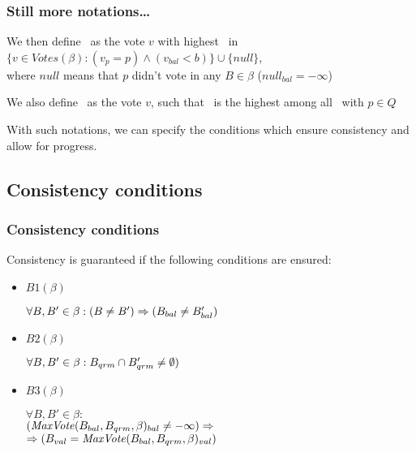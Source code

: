 \documentclass[10 pt]{beamer}
\begin{document}
\begin{frame}
  \frametitle{Still more notations\ldots}

  We then define \maxvotep\ as the vote $v$ with highest \vbal\ in 
 $\{v \in Votes(\beta) : (v_p = p) \wedge (v_{bal} < b)\} \cup \{null\}$,\\
 where $null$ means that $p$ didn't vote in any $B \in \beta$ ($null_{bal} = -\infty$)

  \vspace{4 mm}
  We also define \maxvoteq\ as the vote $v$, such that \vbal\ is the highest among all \maxvotep\ with $p \in Q$

  \vspace{8 mm}
  {\small With such notations, we can specify the conditions which ensure consistency and allow for progress.}

\end{frame}

\subsection{Consistency conditions}


\begin{frame}
  \frametitle{Consistency conditions}

  Consistency is guaranteed if the following conditions are ensured:

  \begin{itemize}
    \item $B1(\beta)$
    
    $\forall B, B' \in \beta : (B \neq B') \Rightarrow (B_{bal} \neq B'_{bal})$
   
    \pause
    \vspace{4 mm}
    \item $B2(\beta)$ %
  
    $\forall B, B' \in \beta : B_{qrm} \cap B'_{qrm} \neq \emptyset)$
    
    \pause
    \vspace{4 mm}
    \item $B3(\beta)$
  
    $\forall B, B' \in \beta :$\\
    $(\text{\textit{MaxVote}}(B_{bal}, B_{qrm}, \beta)_{bal} \neq -\infty) \Rightarrow$\\
    $\Rightarrow (B_{val} = \text{\textit{MaxVote}}(B_{bal}, B_{qrm}, \beta)_{val})$
  \end{itemize}

\end{frame}
\end{document}
